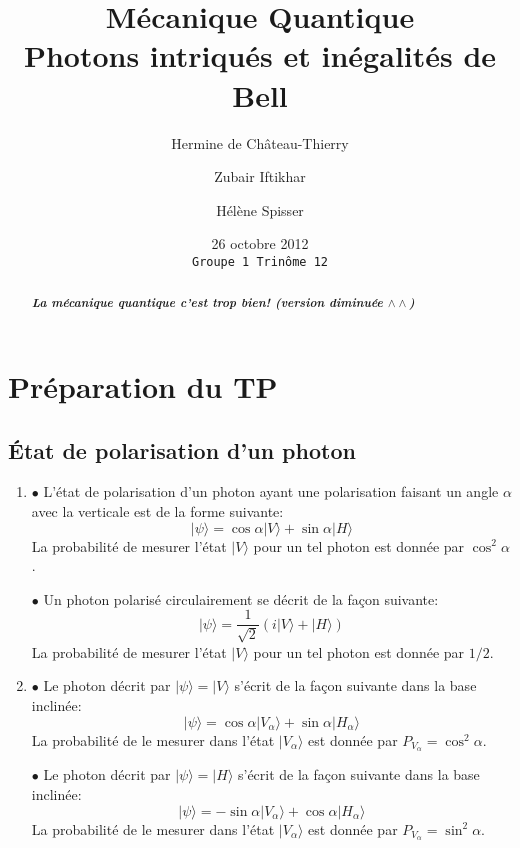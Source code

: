 \documentclass[twocolumn, 10pt]{article}
\title{ Mécanique Quantique \\ Photons intriqués et inégalités de Bell}
\author{Hermine de Château-Thierry \and{Zubair Iftikhar} \and{Hélène Spisser}}
\date{26 octobre 2012 \\ \vspace{1em} \texttt{Groupe \no{}1 \hspace{2em} Trinôme \no{}12}}
\newcommand{\ket}[1]{\ensuremath{|#1\rangle}\xspace}
\begin{document}
\maketitle
\begin{abstract}
{{\itshape \bfseries
    La mécanique quantique c'est trop bien!
    (version diminuée $\wedge \wedge$)
}}
\end{abstract}



\section{Préparation du TP}

\subsection{\'Etat de polarisation d'un photon}

\begin{enumerate} 

    \item \par $\bullet$ L'état de polarisation d'un photon ayant une polarisation faisant un angle $\alpha$ avec la verticale est de la forme suivante:
        \[\ket{\psi} = \cos{\alpha} \ket{V} +  \sin{\alpha} \ket{H}\] 
La probabilité de mesurer l'état $\ket{V}$ pour un tel photon est donnée par $\cos^2{\alpha}$.

    \par $\bullet$ Un photon polarisé circulairement se décrit de la façon suivante:
\[\ket{\psi} =  \frac{1}{\sqrt{2}} ( i \ket{V} +  \ket{H} )\]
La probabilité de mesurer l'état $\ket{V}$ pour un tel photon est donnée par $1/2$.

    \item \par $\bullet$ Le photon décrit par $\ket{\psi} = \ket{V}$ s'écrit de la façon suivante dans la base inclinée: 
\[\ket{\psi} = \cos{\alpha} \ket{V_{\alpha}} +  \sin{\alpha} \ket{H_{\alpha}}\]
La probabilité de le mesurer dans l'état $\ket{V_{\alpha}}$ est donnée par $P_{V_{\alpha}} = \cos^2{\alpha}$.
    \par $\bullet$ Le photon décrit par $\ket{\psi} = \ket{H}$ s'écrit de la façon suivante dans la base inclinée: 
\[\ket{\psi} = -\sin{\alpha} \ket{V_{\alpha}} +  \cos{\alpha} \ket{H_{\alpha}}\]
La probabilité de le mesurer dans l'état $\ket{V_{\alpha}}$ est donnée par $P_{V_{\alpha}} = \sin^2{\alpha}$.

\end{enumerate}
\end{document}

